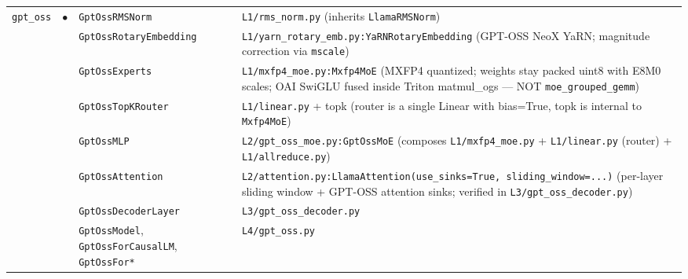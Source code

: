 \documentclass[10pt]{article}
\begin{document}
{\begin{longtable}{@{}p{1.6cm} c p{4.0cm} p{14.5cm}@{}}
\multirow{8}{*}{\texttt{gpt\_oss}} & \multirow{8}{*}{$\bullet$}
   & \texttt{GptOssRMSNorm}           & \texttt{L1/rms\_norm.py} (inherits \texttt{LlamaRMSNorm}) \\
&& \texttt{GptOssRotaryEmbedding}     & \texttt{L1/yarn\_rotary\_emb.py:YaRNRotaryEmbedding} (GPT-OSS NeoX YaRN; magnitude correction via \texttt{mscale}) \\
&& \texttt{GptOssExperts}             & \texttt{L1/mxfp4\_moe.py:Mxfp4MoE} (MXFP4 quantized; weights stay packed uint8 with E8M0 scales; OAI SwiGLU fused inside Triton matmul\_ogs --- NOT \texttt{moe\_grouped\_gemm}) \\
&& \texttt{GptOssTopKRouter}          & \texttt{L1/linear.py} + topk (router is a single Linear with bias=True, topk is internal to \texttt{Mxfp4MoE}) \\
&& \texttt{GptOssMLP}                 & \texttt{L2/gpt\_oss\_moe.py:GptOssMoE} (composes \texttt{L1/mxfp4\_moe.py} + \texttt{L1/linear.py} (router) + \texttt{L1/allreduce.py}) \\
&& \texttt{GptOssAttention}           & \texttt{L2/attention.py:LlamaAttention(use\_sinks=True, sliding\_window=...)} (per-layer sliding window + GPT-OSS attention sinks; verified in \texttt{L3/gpt\_oss\_decoder.py}) \\
&& \texttt{GptOssDecoderLayer}        & \texttt{L3/gpt\_oss\_decoder.py} \\
&& \texttt{GptOssModel}, \texttt{GptOssForCausalLM}, \texttt{GptOssFor*} & \texttt{L4/gpt\_oss.py} \\
\midrule


\end{longtable}}
\end{document}

